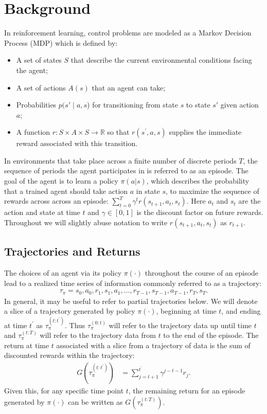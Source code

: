 \documentclass[conference]{IEEEtran}
\begin{document}
\section{Background}
\noindent In reinforcement learning, control problems are modeled as a Markov Decision Process (MDP) \cite{bellman1957dynamic} which is defined by:
\begin{itemize}
\item A set of states $S$ that describe the current environmental conditions facing the agent;
\item A set of actions $A(s)$ that an agent can take;
\item Probabilities $p(s'\mid a,s$) for transitioning from state $s$ to state $s'$ given action $a$;
\item A function $r:S\times A\times S \to \mathbb{R}$ so that $r(s^{\prime},a,s)$ supplies the immediate reward associated with this transition.
\end{itemize} In environments that take place across a finite number of discrete periods $T$, the sequence of periods the agent participates in is referred to as an episode. The goal of the agent is to learn a policy $\pi(a|s)$, which describes the probability that a trained agent should take action $a$ in state $s$, to maximize the sequence of rewards across across an episode: $\sum_{t = 0}^T\gamma^tr(s_{t+1},a_t,s_t)$.  Here $a_t$ and $s_t$ are the action and state at time $t$ and $\gamma\in[0,1]$ is the discount factor on future rewards.  Throughout we will slightly abuse notation to write $r(s_{t+1},a_t,s_t)$ as $r_{t+1}$.

\subsection{Trajectories and Returns}
\noindent The choices of an agent via its policy $\pi(\cdot)$ throughout the course of an episode lead to a realized time series of information commonly referred to as a trajectory:
\begin{align*}
\tau_{\pi} = s_0,a_0,r_1,s_1,a_1,\hdots,r_{T-1},s_{T-1},a_{T-1},r_T,s_T.
\end{align*}
In general, it may be useful to refer to partial trajectories below.  We will denote a slice of a trajectory generated by policy $\pi(\cdot)$, beginning at time $t$, and ending at time $t^{\prime}$ as $\tau_{\pi}^{(t:t^{\prime})}$.  Thus $\tau_{\pi}^{(0:t)}$ will refer to the trajectory data up until time $t$ and $\tau_{\pi}^{(t:T)}$ will refer to the trajectory data from $t$ to the end of the episode. The return at time $t$ associated with a slice from a trajectory of data is the sum of discounted rewards within the trajectory:
\begin{align*}
G(\tau_{\pi}^{(t:t^{\prime})}) &= \sum_{j=t+1}^{t^{\prime}}\gamma^{j-t-1}r_{j}.
\end{align*}
Given this, for any specific time point $t$, the remaining return for an episode generated by $\pi(\cdot)$ can be written as $G(\tau_{\pi}^{(t:T)})$.
\end{document}
